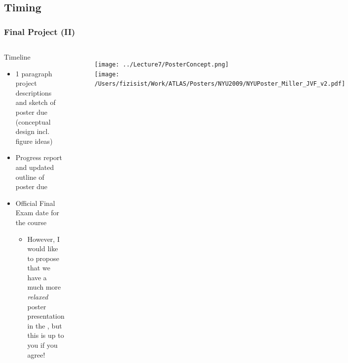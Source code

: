 \documentclass[hyperref={colorlinks=true}]{beamer}
\begin{document}
\subsection[Timing]{Timing}


\begin{frame}%
  \frametitle{Final Project (II)}

  \begin{columns}
  
    
  \begin{ucblock}{Timeline}
    \begin{itemize}
      \item {} 1 paragraph project descriptions and sketch of poster due (conceptual design incl. figure ideas)
      \item {} Progress report and updated outline of poster due
      \item {} Official Final Exam date for the course
      \begin{itemize}
        \item However, I would like to propose that we have a much more \textit{relaxed} poster presentation in the , but this is up to you if you agree!
      \end{itemize}
    \end{itemize}
  \end{ucblock}
  
  
  \vspace{-1cm}
  
  \begin{figure}
    \texttt{[image: ../Lecture7/PosterConcept.png]}\\
    \texttt{[image: /Users/fizisist/Work/ATLAS/Posters/NYU2009/NYUPoster\_Miller\_JVF\_v2.pdf]}\\
  \end{figure}

  
  \end{columns}

  
\end{frame}
\end{document}
